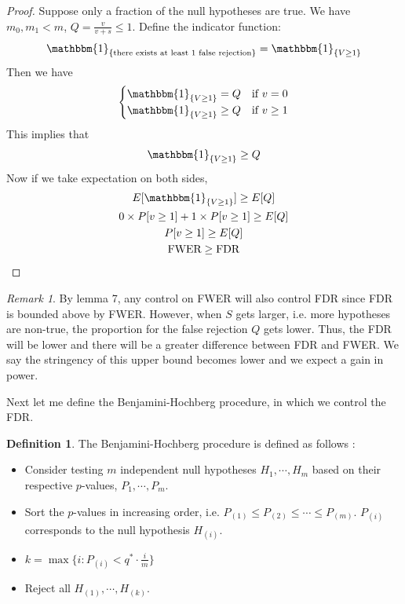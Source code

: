 \documentclass[12pt]{article}
\theoremstyle{plain}
\theoremstyle{definition}
\newtheorem{definition}{Definition}
\theoremstyle{remark}
\newtheorem*{remark}{Remark}
\begin{document}
\begin{proof} \cite{5.3}
Suppose only a fraction of the null hypotheses are true. We have $m_0, m_1<m$, $Q=\frac{v}{v+s}\leq1$. Define the indicator function:
\[\mathbbm{1}_{\{\text{there exists at least 1 false rejection}\}}=\mathbbm{1}_{\{V\ge1\}}\]
Then we have
\begin{equation*}
    \begin{cases}
    \mathbbm{1}_{\{V\ge1\}}=Q & \text{if $v=0$}\\
    \mathbbm{1}_{\{V\ge1\}}\ge Q & \text{if $v\ge1$}
    \end{cases}
\end{equation*}
This implies that\[\mathbbm{1}_{\{V\ge1\}}\ge Q\]
Now if we take expectation on both sides,
\begin{gather*}
    E[\mathbbm{1}_{\{V\ge1\}}]\ge E[Q]\\
    0\times P[v\ge1]+1\times P[v\ge1]\ge E[Q]\\
    P[v\ge1]\ge E[Q]\\
    \text{FWER}\ge \text{FDR}
\end{gather*}
\end{proof}

\begin{remark}
By lemma 7, any control on FWER will also control FDR since FDR is bounded above by FWER. However, when $S$ gets larger, i.e. more hypotheses are non-true, the proportion for the false rejection $Q$ gets lower. Thus, the FDR will be lower and there will be a greater difference between FDR and FWER. We say the stringency of this upper bound becomes lower and we expect a gain in power.\cite{5.3}\cite{5.7}
\end{remark}

Next let me define the Benjamini-Hochberg procedure, in which we control the FDR. 
\begin{definition}
The Benjamini-Hochberg procedure is defined as follows \cite{5.7}:
\begin{itemize}
    \item Consider testing $m$ independent null hypotheses $H_1,\cdots,H_m$ based on their respective $p$-values, $P_1,\cdots,P_m$.
    \item Sort the $p$-values in increasing order, i.e. $P_{(1)}\leq P_{(2)}\leq\cdots\leq P_{(m)}$. $P_{(i)}$ corresponds to the null hypothesis $H_{(i)}$.
    \item $k=\max\{i: P_{(i)}< q^*\cdot \frac{i}{m}\}$
    \item Reject all $H_{(1)},\cdots,H_{(k)}$.
\end{itemize}
\end{definition}
\end{document}
